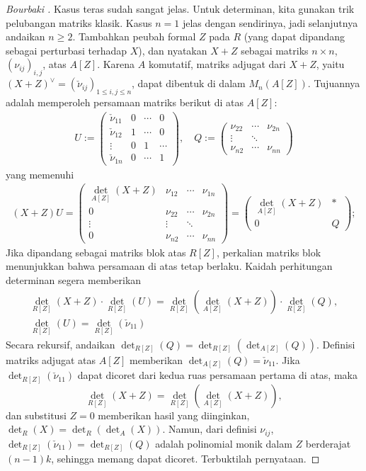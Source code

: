 \begin{proof}[{Bourbaki {\cite[III.112]{Bou-Alg1}}}]
	Kasus teras sudah sangat jelas. Untuk determinan, kita gunakan trik pelubangan matriks klasik. Kasus $n=1$ jelas dengan sendirinya, jadi selanjutnya andaikan $n \geq 2$. Tambahkan peubah formal $Z$ pada $R$ (yang dapat dipandang sebagai perturbasi terhadap $X$), dan nyatakan $X+Z$ sebagai matriks $n \times n$, $(\nu_{ij})_{i,j}$, atas $A[Z]$. Karena $A$ komutatif, matriks adjugat dari $X+Z$, yaitu $(X+Z)^\vee = (\check{\nu}_{ij})_{1 \leq i,j \leq n}$, dapat dibentuk di dalam $M_n(A[Z])$. Tujuannya adalah memperoleh persamaan matriks berikut di atas $A[Z]$:
	\begin{gather*} U := \begin{pmatrix}
		\check{\nu}_{11} & 0 & \cdots & 0 \\
		\check{\nu}_{12} & 1 & \cdots & 0 \\
		\vdots & 0 & 1 & \cdots \\
		\check{\nu}_{1n} & 0 & \cdots & 1
	\end{pmatrix}, \quad Q := \begin{pmatrix}
		\nu_{22} & \cdots & \nu_{2n} \\
		\vdots & \ddots & \\
		\nu_{n2} & \cdots & \nu_{nn}
	\end{pmatrix}\end{gather*}
	yang memenuhi
	\begin{gather*}
	(X+Z) U  = \begin{pmatrix}
		\det_{A[Z]}(X+Z) & \nu_{12} & \cdots & \nu_{1n} \\
		0 & \nu_{22} & \cdots & \nu_{2n} \\
		\vdots & \vdots & \ddots & \\
		0 & \nu_{n2} & \cdots & \nu_{nn}
	\end{pmatrix} = \begin{pmatrix}
		\det_{A[Z]}(X+Z) & \ast \\
		0 & Q
	\end{pmatrix}; \end{gather*}
	Jika dipandang sebagai matriks blok atas $R[Z]$, perkalian matriks blok menunjukkan bahwa persamaan di atas tetap berlaku. Kaidah perhitungan determinan segera memberikan
	\begin{gather*}
		\det_{R[Z]}(X+Z) \cdot \det_{R[Z]}(U) = \det_{R[Z]}\left( \det_{A[Z]}(X+Z)\right) \cdot \det_{R[Z]}(Q), \\
		\det_{R[Z]}(U) = \det_{R[Z]}(\check{\nu}_{11})
	\end{gather*}
	Secara rekursif, andaikan $\det_{R[Z]}(Q) = \det_{R[Z]}\left(\det_{A[Z]}(Q)\right)$. Definisi matriks adjugat atas $A[Z]$ memberikan $\det_{A[Z]}(Q) = \check{\nu}_{11}$. Jika $\det_{R[Z]}(\check{\nu}_{11})$ dapat dicoret dari kedua ruas persamaan pertama di atas, maka
	\[ \det_{R[Z]}(X+Z) = \det_{R[Z]}\left( \det_{A[Z]}(X+Z)\right), \]
	dan substitusi $Z=0$ memberikan hasil yang diinginkan, $\det_R(X) = \det_R(\det_A(X))$. Namun, dari definisi $\nu_{ij}$, $\det_{R[Z]}(\check{\nu}_{11}) = \det_{R[Z]}(Q)$ adalah polinomial monik dalam $Z$ berderajat $(n-1)k$, sehingga memang dapat dicoret. Terbuktilah pernyataan.
\end{proof}

